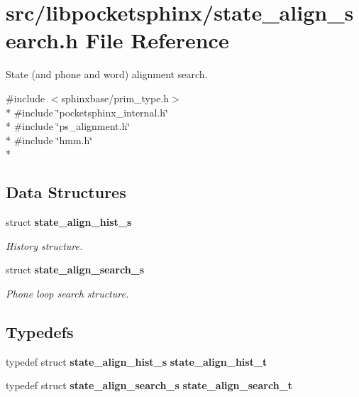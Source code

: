 \section{src/libpocketsphinx/state\-\_\-align\-\_\-search.h File Reference}
\label{state__align__search_8h}


State (and phone and word) alignment search.  


{\ttfamily \#include $<$sphinxbase/prim\-\_\-type.\-h$>$}\\*
{\ttfamily \#include \char`\"{}pocketsphinx\-\_\-internal.\-h\char`\"{}}\\*
{\ttfamily \#include \char`\"{}ps\-\_\-alignment.\-h\char`\"{}}\\*
{\ttfamily \#include \char`\"{}hmm.\-h\char`\"{}}\\*
\subsection*{Data Structures}
\begin{DoxyCompactItemize}
\item 
struct {\bf state\-\_\-align\-\_\-hist\-\_\-s}
\begin{DoxyCompactList}\small\item\em History structure. \end{DoxyCompactList}\item 
struct {\bf state\-\_\-align\-\_\-search\-\_\-s}
\begin{DoxyCompactList}\small\item\em Phone loop search structure. \end{DoxyCompactList}\end{DoxyCompactItemize}
\subsection*{Typedefs}
\begin{DoxyCompactItemize}
\item 
typedef struct {\bf state\-\_\-align\-\_\-hist\-\_\-s} {\bfseries state\-\_\-align\-\_\-hist\-\_\-t}\label{state__align__search_8h_a177ee88fd0b1e9f99bfa7cf7f9f256da}

\item 
typedef struct {\bf state\-\_\-align\-\_\-search\-\_\-s} {\bfseries state\-\_\-align\-\_\-search\-\_\-t}\label{state__align__search_8h_a4559ae74ee038260ff66f432a7205aa8}

\end{DoxyCompactItemize}
